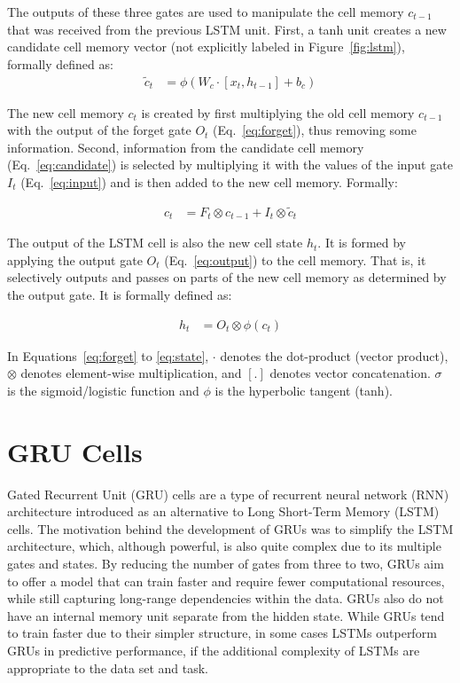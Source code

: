 The outputs of these three gates are used to manipulate the cell memory $c_{t-1}$ that was received from the previous LSTM unit. First, a tanh unit creates a new candidate cell memory vector (not explicitly labeled in Figure~\ref{fig:lstm}), formally defined as:
\begin{align}
\tilde{c}_t &= \phi (W_c \cdot [ x_t, h_{t-1}] + b_c) \label{eq:candidate}
\end{align}

The new cell memory $c_t$ is created by first multiplying the old cell memory $c_{t-1}$ with the output of the forget gate $O_t$ (Eq.~\ref{eq:forget}), thus removing some information. Second, information from the candidate cell memory (Eq.~\ref{eq:candidate}) is selected by multiplying it with the values of the input gate $I_t$ (Eq.~\ref{eq:input}) and is then added to the new cell memory. Formally:

\begin{align}
c_t &= F_t \otimes c_{t-1} + I_t \otimes \tilde{c}_t \label{eq:memory}
\end{align}

The output of the LSTM cell is also the new cell state $h_t$. It is formed by applying the output gate $O_t$ (Eq.~\ref{eq:output}) to the cell memory. That is, it selectively outputs and passes on parts of the new cell memory as determined by the output gate. It is formally defined as:

\begin{align}
h_t &= O_t \otimes \phi(c_t) \label{eq:state}
\end{align}

In Equations~\ref{eq:forget} to \ref{eq:state}, $\cdot$ denotes the dot-product (vector product), $\otimes$ denotes element-wise multiplication, and $[.]$ denotes vector concatenation. $\sigma$ is the sigmoid/logistic function and $\phi$ is the hyperbolic tangent (tanh).

\section{GRU Cells}

Gated Recurrent Unit (GRU) cells are a type of recurrent neural network (RNN) architecture introduced as an alternative to Long Short-Term Memory (LSTM) cells. The motivation behind the development of GRUs was to simplify the LSTM architecture, which, although powerful, is also quite complex due to its multiple gates and states. By reducing the number of gates from three to two, GRUs aim to offer a model that can train faster and require fewer computational resources, while still capturing long-range dependencies within the data. GRUs also do not have an internal memory unit separate from the hidden state. While GRUs tend to train faster due to their simpler structure, in some cases LSTMs outperform GRUs in predictive performance, if the additional complexity of LSTMs are appropriate to the data set and task.


